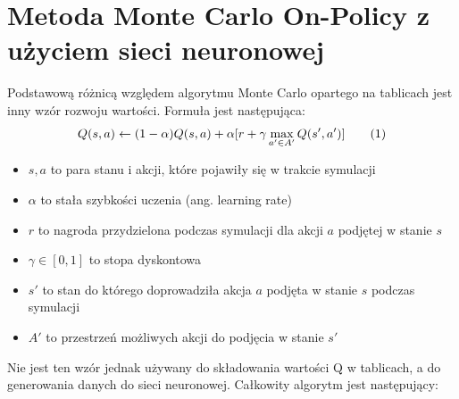 \documentclass[12pt]{book}
\theoremstyle{plain}
\newcommand\addtag{\refstepcounter{equation}
\renewcommand{\labelenumii}{\theenumii}
\renewcommand{\theenumii}{\theenumi.\arabic{enumii}.}
\tag{\theequation}}
\begin{document}
\section{Metoda Monte Carlo On-Policy z użyciem sieci neuronowej} \label{learning:DQN_single_agent}
Podstawową różnicą względem algorytmu Monte Carlo opartego na tablicach jest inny wzór rozwoju wartości. Formuła jest następująca:
\[Q(s,a) \leftarrow (1-\alpha)Q(s,a) + \alpha [r + \gamma \max_{a' \in A'} Q(s',a')] \addtag \label{eq:Q_DQN} \]
\begin{itemize}
	\item $ s,a $ to para stanu i akcji, które pojawiły się w trakcie symulacji
	\item $\alpha$ to stała szybkości uczenia (ang. learning rate)
	\item $ r $ to nagroda przydzielona podczas symulacji dla akcji $ a $ podjętej w stanie $ s $
	\item $\gamma \in [0,1]$  to stopa dyskontowa
	\item $ s' $ to stan do którego doprowadziła akcja $ a $ podjęta w stanie $ s $ podczas symulacji
	\item $ A' $ to przestrzeń możliwych akcji do podjęcia w stanie $ s' $
\end{itemize}
Nie jest ten wzór jednak używany do składowania wartości Q w tablicach, a do generowania danych do sieci neuronowej. Całkowity algorytm jest następujący:
\end{document}
